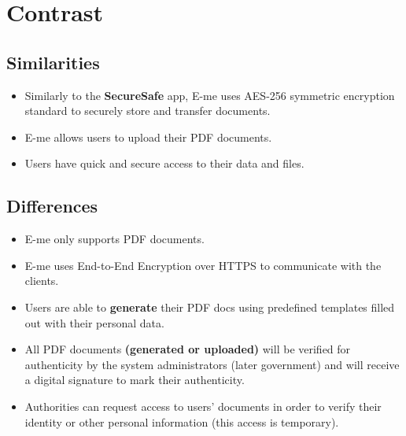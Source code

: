 \documentclass[12pt]{article}
\begin{document}
    \section{Contrast}
        \subsection{Similarities}
            \begin{itemize}
                \item Similarly to the \textbf{SecureSafe} app, E-me uses AES-256 symmetric encryption standard to securely store and transfer documents.
                \item E-me allows users to upload their PDF documents.
                \item Users have quick and secure access to their data and files.
            \end{itemize}
        \subsection{Differences}
            \begin{itemize}
                \item E-me only supports PDF documents.
                \item E-me uses End-to-End Encryption over HTTPS to communicate with the clients.
                \item Users are able to \textbf{generate} their PDF docs using predefined templates filled out with their personal data.
                \item All PDF documents \textbf{(generated or uploaded)} will be verified for authenticity by the system administrators (later government) and will receive a digital signature to mark their authenticity.
                \item Authorities can request access to users' documents in order to verify their identity or other personal information (this access is temporary). 
            \end{itemize}
\end{document}
